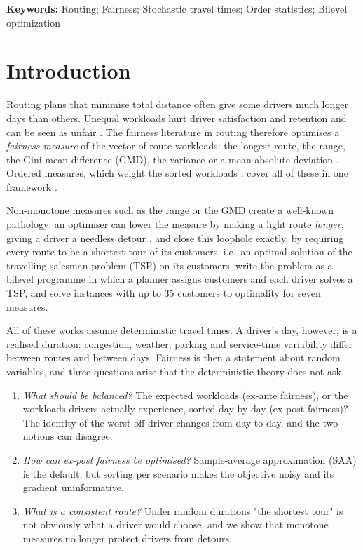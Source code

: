 \documentclass[11pt]{article}
\theoremstyle{definition}
\begin{document}
\noindent\textbf{Keywords:} Routing; Fairness; Stochastic travel times; Order statistics; Bilevel optimization


\section{Introduction}

Routing plans that minimise total distance often give some drivers much
longer days than others. Unequal workloads hurt driver satisfaction and
retention and can be seen as unfair \citep{matl2018workload}. The fairness
literature in routing therefore optimises a \emph{fairness measure} of the
vector of route workloads: the longest route, the range, the Gini mean
difference (GMD), the variance or a mean absolute deviation
\citep{matl2018workload,karsu2015inequity,bektas2020lp}. Ordered measures, which
weight the sorted workloads \citep{yager1988owa,ogryczak2003solving,nickel2005location},
cover all of these in one framework \citep{blanco2026optimization}.

Non-monotone measures such as the range or the GMD create a well-known
pathology: an optimiser can lower the measure by making a light route
\emph{longer}, giving a driver a needless detour
\citep{matl2018workload}. \citet{vanrossum2026efficient,vanrossum2026enforcing}
and \citet{ljubic2026fair} close this loophole exactly, by requiring every route to
be a shortest tour of its customers, i.e.\ an optimal solution of the
travelling salesman problem (TSP) on its customers. \citet{ljubic2026fair}
write the problem as a bilevel programme in which a planner assigns customers
and each driver solves a TSP, and solve instances with up to 35 customers to
optimality for seven measures.

All of these works assume deterministic travel times. A driver's day,
however, is a realised duration: congestion, weather, parking and
service-time variability differ between routes and between days. Fairness
is then a statement about random variables, and three questions arise that
the deterministic theory does not ask.
\begin{enumerate}
\item \emph{What should be balanced?} The expected workloads (ex-ante
fairness), or the workloads drivers actually experience, sorted day by day
(ex-post fairness)? The identity of the worst-off driver changes from day to
day, and the two notions can disagree.
\item \emph{How can ex-post fairness be optimised?} Sample-average
approximation (SAA) is the default, but sorting per scenario makes the
objective noisy and its gradient uninformative.
\item \emph{What is a consistent route?} Under random durations "the
shortest tour" is not obviously what a driver would choose, and we show
that monotone measures no longer protect drivers from detours.
\end{enumerate}
\end{document}
